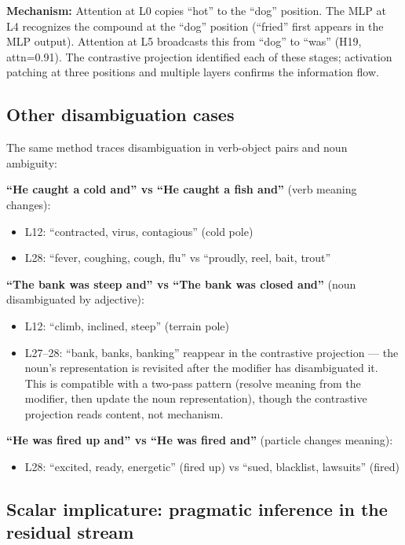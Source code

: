 \documentclass[11pt]{article}
\begin{document}
\textbf{Mechanism:} Attention at L0 copies ``hot'' to the ``dog'' position. The MLP at
L4 recognizes the compound at the ``dog'' position (``fried'' first appears in the
MLP output). Attention at L5 broadcasts this from ``dog'' to ``was'' (H19,
attn=0.91). The contrastive projection identified each of these stages; activation
patching at three positions and multiple layers confirms the information flow.

\subsection{Other disambiguation cases}

The same method traces disambiguation in verb-object pairs and noun ambiguity:

\textbf{``He caught a cold and'' vs ``He caught a fish and''} (verb meaning changes):
\begin{itemize}[leftmargin=*]
\item L12: ``contracted, virus, contagious'' (cold pole)
\item L28: ``fever, coughing, cough, flu'' vs ``proudly, reel, bait, trout''
\end{itemize}

\textbf{``The bank was steep and'' vs ``The bank was closed and''} (noun disambiguated by
adjective):
\begin{itemize}[leftmargin=*]
\item L12: ``climb, inclined, steep'' (terrain pole)
\item L27--28: ``bank, banks, banking'' reappear in the contrastive projection ---
  the noun's representation is revisited after the modifier has disambiguated
  it. This is compatible with a two-pass pattern (resolve meaning from the
  modifier, then update the noun representation), though the contrastive
  projection reads content, not mechanism.
\end{itemize}

\textbf{``He was fired up and'' vs ``He was fired and''} (particle changes meaning):
\begin{itemize}[leftmargin=*]
\item L28: ``excited, ready, energetic'' (fired up) vs ``sued, blacklist, lawsuits''
  (fired)
\end{itemize}

\subsection{Scalar implicature: pragmatic inference in the residual stream}
\end{document}
